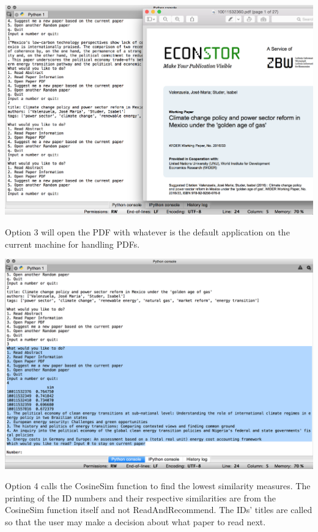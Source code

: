 \documentclass [12pt]{article}
\begin{document}
\begin{center}

\includegraphics[scale = .35]{sshot5}

\end{center}

Option 3 will open the PDF with whatever is the default application on the current machine for handling PDFs.
 
 \begin{center}
 
\includegraphics[scale = .35]{sshot6}

\end{center}

Option 4 calls the CosineSim function to find the lowest similarity measures. The printing of the ID numbers and their respective similarities are from the CosineSim function itself and not ReadAndRecommend. The IDs' titles are called so that the user may make a decision about what paper to read next. 
\end{document}
